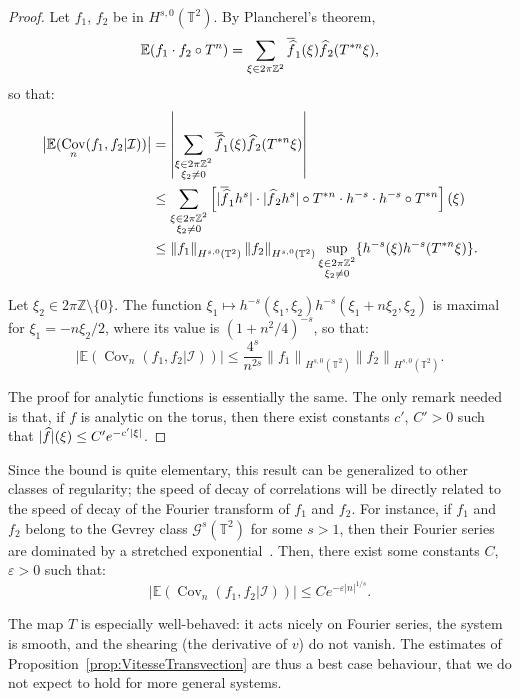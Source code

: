 \documentclass[AHL,Unicode,longabstracts]{cedram}
\DeclareMathOperator{\Cov}{Cov}
\newcommand{\Z}{\mathbb{Z}}
\newcommand{\Ebb}{\mathbb{E}}
\newcommand{\Tbb}{\mathbb{T}}
\newcommand{\Gcal}{\mathcal{G}}
\newcommand{\Ical}{\mathcal{I}}
\newcommand{\norm}[2]{\left\| #1 \right\|_{#2}}
\renewcommand*{\hat}[1]{\mathchoice{\widehat{#1}}{\widehat{#1}}{\oldhat{#1}}{\oldhat{#1}}}\let\oldforall\forall
\renewcommand*{\forall}{\mathrel{\oldforall}}
\begin{document}
\begin{proof}
Let $f_1$, $f_2$ be in $H^{s,0} (\Tbb^2)$. By Plancherel's theorem,
\[
\Ebb (f_1 \cdot f_2 \circ T^n) = \sum_{\xi \in 2\pi\Z^2} \overline{\hat{f}}_1 (\xi) \hat{f}_2 (T^{*n} \xi),
\]
so that:
\begin{align*}
\big| \Ebb (\Cov_n (f_1, f_2|\Ical)) \big| & = \left| \sum_{\substack{\xi \in 2\pi\Z^2 \\ \xi_2 \neq 0}} \overline{\hat{f}}_1 (\xi) \hat{f}_2 (T^{*n} \xi) \right| \\
& \leq \sum_{\substack{\xi \in 2\pi\Z^2 \\ \xi_2 \neq 0}} \left[|\overline{\hat{f}}_1 h^s| \cdot |\hat{f}_2 h^s| \circ T^{*n} \cdot h^{-s} \cdot h^{-s} \circ T^{*n} \right] (\xi) \\
& \leq \norm{f_1}{H^{s,0} (\Tbb^2)} \norm{f_2}{H^{s,0} (\Tbb^2)} \sup_{\substack{\xi \in 2\pi\Z^2 \\ \xi_2 \neq 0}} \{ h^{-s} (\xi) h^{-s} (T^{*n} \xi) \}.
\end{align*}

Let $\xi_2 \in 2\pi\Z \setminus \{0\}$. The function $\xi_1 \mapsto h^{-s} (\xi_1, \xi_2) h^{-s} (\xi_1+n \xi_2, \xi_2)$ is maximal for $\xi_1 = -n \xi_2 /2$, where its value is $(1+n^2/4)^{-s}$, so that:
\[
\big| \Ebb (\Cov_n (f_1, f_2|\Ical)) \big|
\leq \frac{4^s}{n^{2s}} \norm{f_1}{H^{s,0} (\Tbb^2)} \norm{f_2}{H^{s,0} (\Tbb^2)}.
\]

The proof for analytic functions is essentially the same. The only remark needed is that, if $f$ is analytic on the torus, then there exist constants $c'$, $C'>0$ such that $|\hat{f}| (\xi) \leq C' e^{-c' |\xi|}$.
\end{proof}


Since the bound is quite elementary, this result can be generalized to other classes of regularity; the speed of decay of correlations will be directly related to the speed of decay of the Fourier transform of $f_1$ and $f_2$. For instance, if $f_1$ and $f_2$ belong to the Gevrey class $\Gcal^s (\Tbb^2)$ for some $s >1$, then their Fourier series are dominated by a stretched exponential~\cite[Theorem~1.6.1]{Rodino:1993}. Then, there exist some constants $C$, $\varepsilon >0$ such that:
\[
\big| \Ebb (\Cov_n (f_1, f_2|\Ical)) \big|
\leq C e^{-\varepsilon |n|^{1/s}}.
\]


The map $T$ is especially well-behaved: it acts nicely on Fourier series, the system is smooth, and the shearing (the derivative of $v$) do not vanish. The estimates of Proposition~\ref{prop:VitesseTransvection} are thus a best case behaviour, that we do not expect to hold for more general systems.
\end{document}
